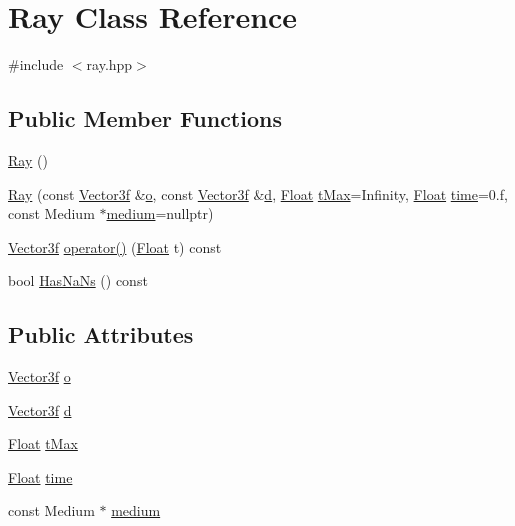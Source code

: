 \hypertarget{classRay}{}\section{Ray Class Reference}
\label{classRay}


{\ttfamily \#include $<$ray.\+hpp$>$}

\subsection*{Public Member Functions}
\begin{DoxyCompactItemize}
\item 
\mbox{\hyperlink{classRay_a2e3d2c29f2df4ab3da10da79d4acb852}{Ray}} ()
\item 
\mbox{\hyperlink{classRay_ad17d8a78f36c7d5c8613f8357ac7d78f}{Ray}} (const \mbox{\hyperlink{cyclop_8hpp_a5a0a2e85b081623ef3f7e7e8d43024f5}{Vector3f}} \&\mbox{\hyperlink{classRay_a89ed1e9bbc4c72c4d44f6d5a615640ae}{o}}, const \mbox{\hyperlink{cyclop_8hpp_a5a0a2e85b081623ef3f7e7e8d43024f5}{Vector3f}} \&\mbox{\hyperlink{classRay_adf1b913872391bb739c891d86416cf92}{d}}, \mbox{\hyperlink{cyclop_8hpp_a07afd7094cb489cbd514c76e6f55d34f}{Float}} \mbox{\hyperlink{classRay_a75dad117c0ccb7aba43c68b326c1d2ac}{t\+Max}}=Infinity, \mbox{\hyperlink{cyclop_8hpp_a07afd7094cb489cbd514c76e6f55d34f}{Float}} \mbox{\hyperlink{classRay_a6b9ba0e2c874503b5a3b72e609b75ece}{time}}=0.f, const Medium $\ast$\mbox{\hyperlink{classRay_a813f5ced5f02efcc75eabc6aedfa7824}{medium}}=nullptr)
\item 
\mbox{\hyperlink{cyclop_8hpp_a5a0a2e85b081623ef3f7e7e8d43024f5}{Vector3f}} \mbox{\hyperlink{classRay_acf15f78bec949afa83834de9127a3fe4}{operator()}} (\mbox{\hyperlink{cyclop_8hpp_a07afd7094cb489cbd514c76e6f55d34f}{Float}} t) const
\item 
bool \mbox{\hyperlink{classRay_a231f9ccb885aed83a741f3f283f05594}{Has\+Na\+Ns}} () const
\end{DoxyCompactItemize}
\subsection*{Public Attributes}
\begin{DoxyCompactItemize}
\item 
\mbox{\hyperlink{cyclop_8hpp_a5a0a2e85b081623ef3f7e7e8d43024f5}{Vector3f}} \mbox{\hyperlink{classRay_a89ed1e9bbc4c72c4d44f6d5a615640ae}{o}}
\item 
\mbox{\hyperlink{cyclop_8hpp_a5a0a2e85b081623ef3f7e7e8d43024f5}{Vector3f}} \mbox{\hyperlink{classRay_adf1b913872391bb739c891d86416cf92}{d}}
\item 
\mbox{\hyperlink{cyclop_8hpp_a07afd7094cb489cbd514c76e6f55d34f}{Float}} \mbox{\hyperlink{classRay_a75dad117c0ccb7aba43c68b326c1d2ac}{t\+Max}}
\item 
\mbox{\hyperlink{cyclop_8hpp_a07afd7094cb489cbd514c76e6f55d34f}{Float}} \mbox{\hyperlink{classRay_a6b9ba0e2c874503b5a3b72e609b75ece}{time}}
\item 
const Medium $\ast$ \mbox{\hyperlink{classRay_a813f5ced5f02efcc75eabc6aedfa7824}{medium}}
\end{DoxyCompactItemize}
